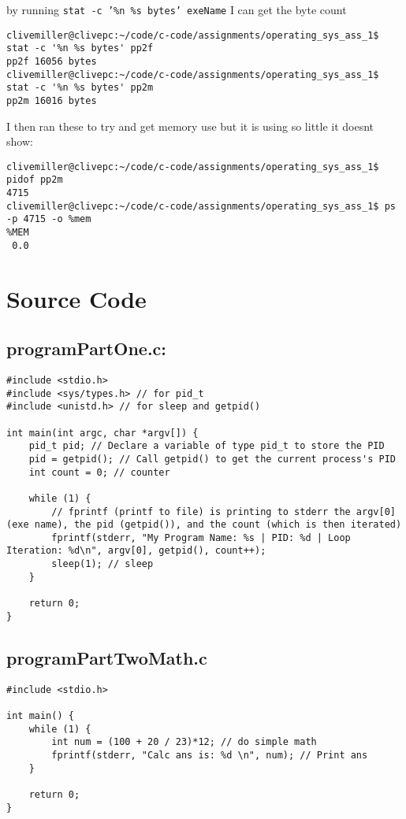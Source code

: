\documentclass[11pt]{article}
\begin{document}
by running \texttt{stat -c '\%n \%s bytes' exeName} I can get the byte count
\begin{lstlisting}[style=bash]
clivemiller@clivepc:~/code/c-code/assignments/operating_sys_ass_1$ stat -c '%n %s bytes' pp2f
pp2f 16056 bytes
clivemiller@clivepc:~/code/c-code/assignments/operating_sys_ass_1$ stat -c '%n %s bytes' pp2m
pp2m 16016 bytes
\end{lstlisting}

I then ran these to try and get memory use but it is using so little it doesnt show:
\begin{lstlisting}[style=bash]
clivemiller@clivepc:~/code/c-code/assignments/operating_sys_ass_1$ pidof pp2m
4715
clivemiller@clivepc:~/code/c-code/assignments/operating_sys_ass_1$ ps -p 4715 -o %mem
%MEM
 0.0
\end{lstlisting}

\section*{Source Code}

\subsection*{programPartOne.c:}
\begin{lstlisting}[style=ccode]
#include <stdio.h>
#include <sys/types.h> // for pid_t
#include <unistd.h> // for sleep and getpid()

int main(int argc, char *argv[]) {
    pid_t pid; // Declare a variable of type pid_t to store the PID
    pid = getpid(); // Call getpid() to get the current process's PID
    int count = 0; // counter

    while (1) {
        // fprintf (printf to file) is printing to stderr the argv[0] (exe name), the pid (getpid()), and the count (which is then iterated)
        fprintf(stderr, "My Program Name: %s | PID: %d | Loop Iteration: %d\n", argv[0], getpid(), count++);
        sleep(1); // sleep
    }

    return 0;
}
\end{lstlisting}

\subsection*{programPartTwoMath.c}
\begin{lstlisting}[style=ccode]
#include <stdio.h>

int main() {
    while (1) {
        int num = (100 + 20 / 23)*12; // do simple math
        fprintf(stderr, "Calc ans is: %d \n", num); // Print ans
    }

    return 0;
}
\end{lstlisting}
\end{document}
